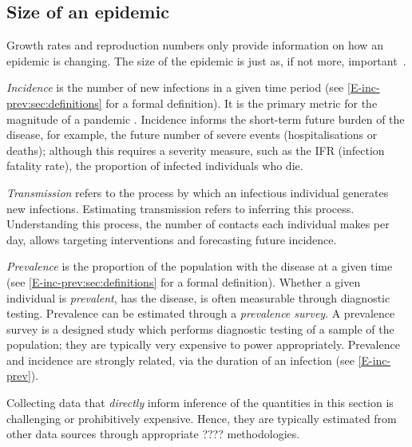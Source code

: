 \documentclass[thesis.tex]{subfiles}
\begin{document}
\subsection{Size of an epidemic}

Growth rates and reproduction numbers only provide information on how an epidemic is changing.
The size of the epidemic is just as, if not more, important~\autocite{pellisEstimation}.

\emph{Incidence} is the number of new infections in a given time period (see \cref{E-inc-prev:sec:definitions} for a formal definition).
It is the primary metric for the magnitude of a pandemic .
Incidence informs the short-term future burden of the disease, for example, the future number of severe events (hospitalisations or deaths); although this requires a severity measure, such as the IFR (infection fatality rate), the proportion of infected individuals who die.

\emph{Transmission} refers to the process by which an infectious individual generates new infections.
Estimating transmission refers to inferring this process. Understanding this process, \eg the number of contacts each individual makes per day, allows targeting interventions and forecasting future incidence.

\emph{Prevalence} is the proportion of the population with the disease at a given time (see \cref{E-inc-prev:sec:definitions} for a formal definition).
Whether a given individual is \emph{prevalent}, \ie has the disease, is often measurable through diagnostic testing.
Prevalence can be estimated through a \emph{prevalence survey}.
A prevalence survey is a designed study which performs diagnostic testing of a sample of the population; they are typically very expensive to power appropriately.
Prevalence and incidence are strongly related, via the duration of an infection (see \cref{E-inc-prev}).


Collecting data that \emph{directly} inform inference of the quantities in this section is challenging or prohibitively expensive.
Hence, they are typically estimated from other data sources through appropriate ???? methodologies.
{\color{red}{refer to some papers examples:Phil O'neil, stats in medicine, 1990 on linking models to data; De Angelis, Presanis, Analysing Multiple Epidemic Data Sources. "Handbook of
Infectious Disease Data Analysis", Held, L., Hens, N., O'Neill, P.D. and Wallinga, J. (Eds.).
Chapman & Hall/CRC, 2019.}}
\end{document}
